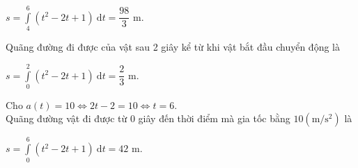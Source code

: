\begin{ex}
{\begin{itemchoice}
\begin{center}
				$s=\displaystyle \int \limits_4^{6} (t^2-2t+1) \mathrm{~d}t=\dfrac{98}{3}$ m.
			\end{center}
			\itemch Quãng đường đi được của vật sau 2 giây kể từ khi vật bắt đầu chuyển động là\\
			\begin{center}
				$s=\displaystyle \int \limits_0^{2} (t^2-2t+1) \mathrm{~d}t=\dfrac{2}{3}$ m.
			\end{center}
			\itemch Cho $a(t)=10\Leftrightarrow 2t-2=10 \Leftrightarrow t=6$.\\
			Quãng đường vật đi được từ 0 giây đến thời điểm mà gia tốc bằng $10(\mathrm{m} / \mathrm{s}^2)$ là\\
			\begin{center}
				$s=\displaystyle \int \limits_0^{6} (t^2-2t+1) \mathrm{~d}t=42$ m.
			\end{center}
		\end{itemchoice}
	}
\end{ex}

